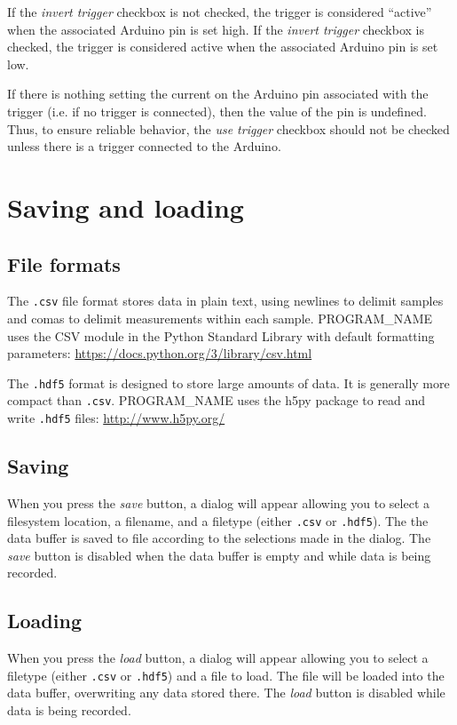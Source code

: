 \documentclass[11pt,letterpaper,article,oneside]{memoir}
\newcommand{\name}{PROGRAM\_NAME}
\newcommand{\csv}{\texttt{.csv}}
\newcommand{\hdf}{\texttt{.hdf5}}
\begin{document}
If the \emph{invert trigger} checkbox is not checked, the trigger is considered
``active'' when the associated Arduino pin is set high. If the \emph{invert
trigger} checkbox is checked, the trigger is considered active when the
associated Arduino pin is set low.

If there is nothing setting the current on the Arduino pin associated with the
trigger (i.e. if no trigger is connected), then the value of the pin is
undefined.  Thus, to ensure reliable behavior, the \emph{use trigger} checkbox
should not be checked unless there is a trigger connected to the Arduino.




\chapter{Saving and loading}
\label{sec:savingloading}

\section{File formats}

\label{sec:fileformats}
The \csv{} file format stores data in plain text, using newlines to delimit
samples and comas to delimit measurements within each sample.  \name{} uses the
CSV module in the Python Standard Library with default formatting parameters:
\url{https://docs.python.org/3/library/csv.html}

The \hdf{} format is designed to store large amounts of data. It is generally more
compact than \csv{}. \name{} uses the h5py package to read and write \hdf{} files:
\url{http://www.h5py.org/}


\section{Saving}

When you press the \emph{save} button, a dialog will appear allowing you to
select a filesystem location, a filename, and a filetype (either \csv{} or
\hdf{}).  The the data buffer is saved to file according to the selections made
in the dialog. The \emph{save} button is disabled when the data buffer is empty
and while data is being recorded.

\section{Loading}

When you press the \emph{load} button, a dialog will appear allowing you to
select a filetype (either \csv{} or \hdf{}) and a file to load. The file will be
loaded into the data buffer, overwriting any data stored there.
The \emph{load} button is disabled while data is being recorded.
\end{document}
